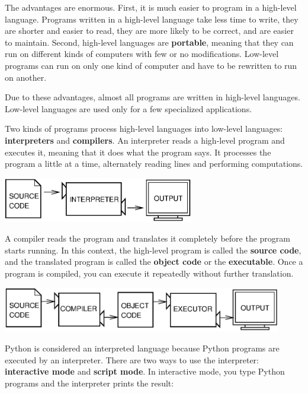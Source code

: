 \documentclass[10pt]{book}
\begin{document}

The advantages are enormous.  First, it is much easier to program
in a high-level language.  Programs written in a high-level language
take less time to write, they are shorter and easier to read, they
are more likely to be correct, and are easier to maintain.  Second, high-level languages are {\bf
portable}, meaning that they can run on different kinds of computers
with few or no modifications.  Low-level programs can run on only one
kind of computer and have to be rewritten to run on another.

Due to these advantages, almost all programs are written in high-level
languages.  Low-level languages are used only for a few specialized
applications.


Two kinds of programs process high-level languages
into low-level languages: {\bf interpreters} and {\bf compilers}.
An interpreter reads a high-level program and executes it, meaning that it
does what the program says.  It processes the program a little at a time,
alternately reading lines and performing computations.

\beforefig
\centerline{\includegraphics[height=0.77in]{figs/interpret.eps}}
\afterfig


A compiler reads the program and translates it completely before the
program starts running.  In this context, the high-level program is
called the {\bf source code}, and the translated program is called the
{\bf object code} or the {\bf executable}.  Once a program is
compiled, you can execute it repeatedly without further translation.

\beforefig
\centerline{\includegraphics[height=0.77in]{figs/compile.eps}}
\afterfig

Python is considered an interpreted language because Python programs
are executed by an interpreter.  There are two ways to use the
interpreter: {\bf interactive mode} and {\bf script mode}. In
interactive mode, you type Python programs and the interpreter prints
the result:
\end{document}
